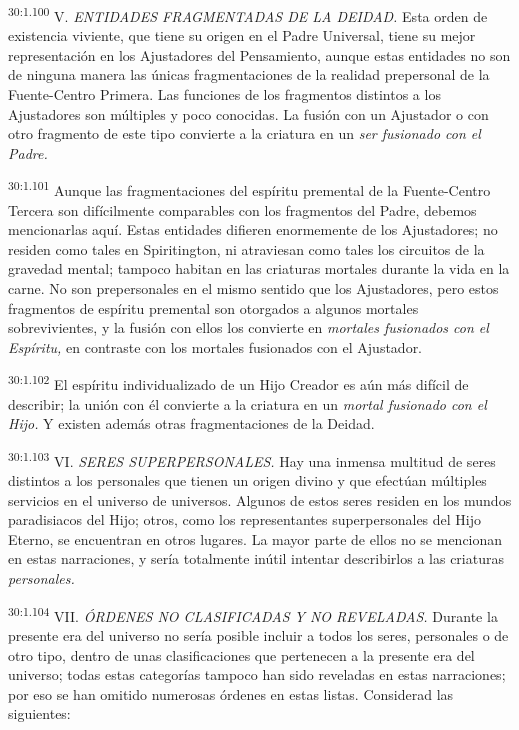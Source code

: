 \par
\textsuperscript{30:1.100} V. \textit{ENTIDADES FRAGMENTADAS DE LA DEIDAD.} Esta orden de existencia viviente, que tiene su origen en el Padre Universal, tiene su mejor representación en los Ajustadores del Pensamiento, aunque estas entidades no son de ninguna manera las únicas fragmentaciones de la realidad prepersonal de la Fuente-Centro Primera. Las funciones de los fragmentos distintos a los Ajustadores son múltiples y poco conocidas. La fusión con un Ajustador o con otro fragmento de este tipo convierte a la criatura en un \textit{ser fusionado con el Padre.}

\par
\textsuperscript{30:1.101} Aunque las fragmentaciones del espíritu premental de la Fuente-Centro Tercera son difícilmente comparables con los fragmentos del Padre, debemos mencionarlas aquí. Estas entidades difieren enormemente de los Ajustadores; no residen como tales en Spiritington, ni atraviesan como tales los circuitos de la gravedad mental; tampoco habitan en las criaturas mortales durante la vida en la carne. No son prepersonales en el mismo sentido que los Ajustadores, pero estos fragmentos de espíritu premental son otorgados a algunos mortales sobrevivientes, y la fusión con ellos los convierte en \textit{mortales fusionados con el Espíritu,} en contraste con los mortales fusionados con el Ajustador.

\par
\textsuperscript{30:1.102} El espíritu individualizado de un Hijo Creador es aún más difícil de describir; la unión con él convierte a la criatura en un \textit{mortal fusionado con el Hijo.} Y existen además otras fragmentaciones de la Deidad.

\par
\textsuperscript{30:1.103} VI. \textit{SERES SUPERPERSONALES.} Hay una inmensa multitud de seres distintos a los personales que tienen un origen divino y que efectúan múltiples servicios en el universo de universos. Algunos de estos seres residen en los mundos paradisiacos del Hijo; otros, como los representantes superpersonales del Hijo Eterno, se encuentran en otros lugares. La mayor parte de ellos no se mencionan en estas narraciones, y sería totalmente inútil intentar describirlos a las criaturas \textit{personales.}

\par
\textsuperscript{30:1.104} VII. \textit{ÓRDENES NO CLASIFICADAS Y NO REVELADAS.} Durante la presente era del universo no sería posible incluir a todos los seres, personales o de otro tipo, dentro de unas clasificaciones que pertenecen a la presente era del universo; todas estas categorías tampoco han sido reveladas en estas narraciones; por eso se han omitido numerosas órdenes en estas listas. Considerad las siguientes:

